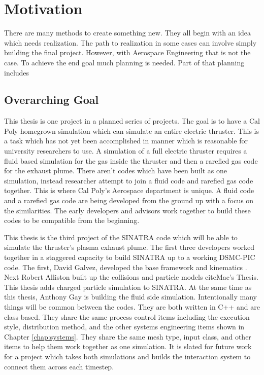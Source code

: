 \section{Motivation}
There are many methods to create something new. They all begin with an idea which needs realization. The path to realization in some cases can involve simply building the final project. However, with Aerospace Engineering that is not the case. To achieve the end goal much planning is needed. Part of that planning includes 
\subsection{Overarching Goal}
This thesis is one project in a planned series of projects. The goal is to have a Cal Poly homegrown simulation which can simulate an entire electric thruster. This is a task which has not yet been accomplished in manner which is reasonable for university researchers to use. A simulation of a full electric thruster requires a fluid based simulation for the gas inside the thruster and then a rarefied gas code for the exhaust plume. There aren't codes which have been built as one simulation, instead researcher attempt to join a fluid code and rarefied gas code together. This is where Cal Poly's Aerospace department is unique. A fluid code and a rarefied gas code are being developed from the ground up with a focus on the similarities. The early developers and advisors work together to build these codes to be compatible from the beginning. \par
This thesis is the third project of the SINATRA code which will be able to simulate the thruster's plasma exhaust plume. The first three developers worked together in a staggered capacity to build SINATRA up to a working DSMC-PIC code. The first, David Galvez, developed the base framework and kinematics \cite{Galvez2018a}. Next Robert Alliston built up the collisions and particle models cite{Mac's Thesis}. This thesis adds charged particle simulation to SINATRA. At the same time as this thesis, Anthony Gay is building the fluid side simulation. Intentionally many things will be common between the codes. They are both written in C++ and are class based. They share the same process control items including the execution style, distribution method, and the other systems engineering items shown in Chapter \ref{chap:systems}. They share the same mesh type, input class, and other items to help them work together as one simulation. It is slated for future work for a project which takes both simulations and builds the interaction system to connect them across each timestep. 



